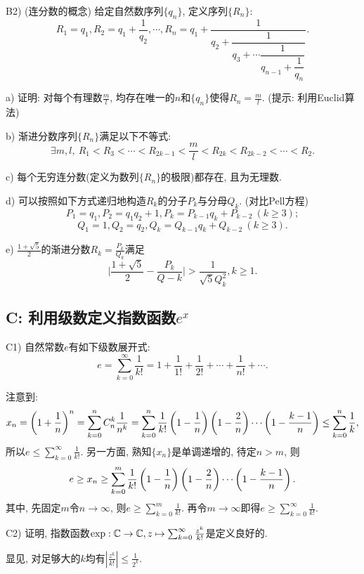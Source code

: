 B2) (连分数的概念) 给定自然数序列$\{ q_n \}$, 定义序列$\{ R_n \}$: $$R_1=q_1, R_2=q_1+\frac{1}{q_2}, \cdots ,R_n = q_1 + \dfrac{1}{q_2 
          + \dfrac{1}{q_3 
          + \cdots \dfrac{1}{q_{n-1}+\dfrac{1}{q_n}}  } }.$$
          
a) 证明: 对每个有理数$\frac{m}{l}$, 均存在唯一的$n$和$\{ q_n \}$使得$R_n=\frac{m}{l}$. (提示: 利用Euclid算法)

b) 渐进分数序列$\{ R_n \}$满足以下不等式: $$\exists m,l,~ R_1<R_3< \cdots <R_{2k-1} < \frac{m}{l} < R_{2k} < R_{2k-2} < \cdots < R_2.$$

c) 每个无穷连分数(定义为数列$\{ R_n \}$的极限)都存在, 且为无理数. 

d) 可以按照如下方式递归地构造$R_k$的分子$P_k$与分母$Q_k$. (对比Pell方程)
$$P_1=q_1, P_2=q_1q_2+1, P_k=P_{k-1}q_k+P_{k-2}~(k \geq 3); $$
$$Q_1=1, Q_2=q_2, Q_k=Q_{k-1}q_k+Q_{k-2}~(k \geq 3).$$

e) $\frac{1+\sqrt{5}}{2}$的渐进分数$R_k=\frac{P_k}{Q_k}$满足$$\big| \frac{1+\sqrt{5}}{2} - \frac{P_k}{Q-k} \big|>\frac{1}{\sqrt{5} Q_k^2}, k \geq 1.$$

\subsection*{C: 利用级数定义指数函数$e^x$} %

C1) 自然常数$e$有如下级数展开式:$$e = \sum_{k=0}^{\infty} \frac{1}{k!} = 1+\frac{1}{1!}+\frac{1}{2!} + \cdots + \frac{1}{n!} + \cdots .$$

\begin{solution}
	注意到: $$x_n = \left( 1+\frac{1}{n} \right)^n = \sum_{k=0}^{n} C_n^k \frac{1}{n^k} = \sum_{k=0}^{n} \frac{1}{k!} \left( 1-\frac{1}{n} \right) \left( 1-\frac{2}{n} \right) \cdots \left( 1-\frac{k-1}{n} \right) \leq \sum_{k=0}^{n} \frac{1}{k}, $$
	所以$e \leq \sum_{k=0}^{\infty} \frac{1}{k!}$. 另一方面, 熟知$\{ x_n \}$是单调递增的, 待定$n>m$, 则$$e \geq x_n \geq \sum_{k=0}^{m} \frac{1}{k!} \left( 1-\frac{1}{n} \right) \left( 1-\frac{2}{n} \right) \cdots \left( 1-\frac{k-1}{n} \right). $$
	其中, 先固定$m$令$n \to \infty$, 则$e \geq \sum_{k=0}^{m} \frac{1}{k!}$. 再令$m \to \infty$即得$e \geq \sum_{k=0}^{\infty} \frac{1}{k!}$. 
\end{solution}

C2) 证明, 指数函数${\rm exp} : \mathbb{C} \to \mathbb{C}, z \mapsto \sum_{k=0}^{\infty} \frac{z^k}{k!}$是定义良好的. 

\begin{solution}
	显见, 对足够大的$k$均有$|\frac{z^k}{k!} | \leq \frac{1}{2^k}$. 
\end{solution}


